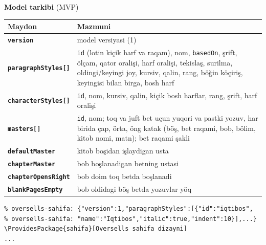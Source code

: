 \documentclass[11pt]{article}
\begin{document}
\textbf{Model tarkibi} (MVP)
\begin{center}\footnotesize
\begin{tabularx}{\linewidth}{>{\bfseries}p{34mm}X}
\toprule
Maydon & Mazmuni\\
\midrule
\texttt{version} & model versiyasi (1)\\
\texttt{paragraphStyles[]} & \texttt{id} (lotin kiçik harf va raqam), nom, \texttt{basedOn}, şrift, ölçam, qator oralişi, harf oralişi, tekislaş, surilma, oldingi/keyingi joy, kursiv, qalin, rang, böğin köçiriş, keyingisi bilan birga, bosh harf\\
\texttt{characterStyles[]} & \texttt{id}, nom, kursiv, qalin, kiçik bosh harflar, rang, şrift, harf oralişi\\
\texttt{masters[]} & \texttt{id}, nom; toq va juft bet uçun yuqori va pastki yozuv, har birida çap, örta, öng katak (böş, bet raqami, bob, bölim, kitob nomi, matn); bet raqami şakli\\
\texttt{defaultMaster} & kitob boşidan işlaydigan usta\\
\texttt{chapterMaster} & bob boşlanadigan betning ustasi\\
\texttt{chapterOpensRight} & bob doim toq betda boşlanadi\\
\texttt{blankPagesEmpty} & bob oldidagi böş betda yozuvlar yöq\\
\bottomrule
\end{tabularx}
\end{center}

\begin{Verbatim}
% oversells-sahifa: {"version":1,"paragraphStyles":[{"id":"iqtibos",
% oversells-sahifa: "name":"Iqtibos","italic":true,"indent":10}],...}
\ProvidesPackage{sahifa}[Oversells sahifa dizayni]
...
\end{Verbatim}

\end{document}
